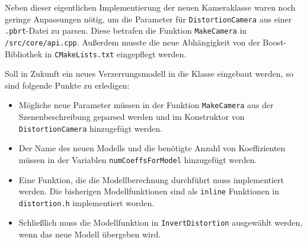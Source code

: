 Neben dieser eigentlichen Implementierung der neuen Kameraklasse waren noch geringe Anpassungen nötig, um die Parameter für \texttt{DistortionCamera} aus einer \texttt{.pbrt}-Datei zu parsen. Diese betrafen die Funktion \texttt{MakeCamera} in \texttt{/src/core/api.cpp}. Außerdem musste die neue Abhängigkeit von der Boost-Bibliothek in \texttt{CMakeLists.txt} eingepflegt werden.

Soll in Zukunft ein neues Verzerrungsmodell in die Klasse eingebaut werden, so sind folgende Punkte zu erledigen:
\begin{itemize}
	\item Mögliche neue Parameter müssen in der Funktion \texttt{MakeCamera} aus der Szenenbeschreibung geparsed werden und im Konstruktor von \texttt{DistortionCamera} hinzugefügt werden.
	\item Der Name des neuen Modells und die benötigte Anzahl von Koeffizienten müssen in der Variablen \texttt{numCoeffsForModel} hinzugefügt werden.
	\item Eine Funktion, die die Modellberechnung durchführt muss implementiert werden. Die bisherigen Modellfunktionen sind als \texttt{inline} Funktionen in \texttt{distortion.h} implementiert worden.
	\item Schließlich muss die Modellfunktion in \texttt{InvertDistortion} ausgewählt werden, wenn das neue Modell übergeben wird.
\end{itemize}